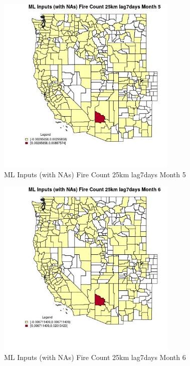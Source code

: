 \clearpage 

\begin{figure} 
\centering  
\includegraphics[width=0.77\textwidth]{Code_Outputs/Report_ML_input_PM25_Step4_part_e_de_duplicated_aves_compiled_2019-05-20wNAs_CountyFire_Count_25km_lag7daysmedianMonth5.jpg} 
\caption{\label{fig:Report_ML_input_PM25_Step4_part_e_de_duplicated_aves_compiled_2019-05-20wNAsCountyFire_Count_25km_lag7daysmedianMonth5}ML Inputs (with NAs) Fire Count 25km lag7days Month 5} 
\end{figure} 
 

\begin{figure} 
\centering  
\includegraphics[width=0.77\textwidth]{Code_Outputs/Report_ML_input_PM25_Step4_part_e_de_duplicated_aves_compiled_2019-05-20wNAs_CountyFire_Count_25km_lag7daysmedianMonth6.jpg} 
\caption{\label{fig:Report_ML_input_PM25_Step4_part_e_de_duplicated_aves_compiled_2019-05-20wNAsCountyFire_Count_25km_lag7daysmedianMonth6}ML Inputs (with NAs) Fire Count 25km lag7days Month 6} 
\end{figure} 
 

